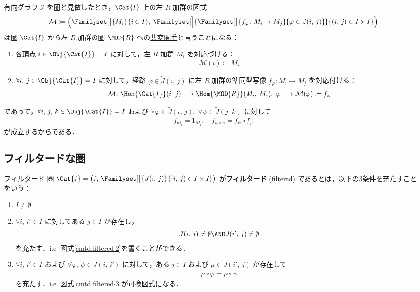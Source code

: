 \documentclass[algtopo_main]{subfiles}
\begin{document}
有向グラフ $\mathcal{I}$ を圏と見做したとき，$\Cat{I}$ 上の左 $R$ 加群の図式
\begin{align}
	\mathcal{M} \coloneqq \Bigl( \Familyset[\big]{M_i}{i \in I},\; \Familyset[\Big]{\Familyset[\big]{f_\varphi \colon M_i \to M_j}{\varphi \in J(i,\, j)}}{(i,\, j) \in I \times I} \Bigr)
\end{align}
は圏 $\Cat{I}$ から左 $R$ 加群の圏 $\MOD{R}$ への\hyperref[def:covariant]{共変関手}と言うことになる：
\begin{enumerate}
	\item 各頂点 $i \in \Obj{\Cat{I}} = I$ に対して，左 $R$ 加群 $M_i$ を対応づける：
	\begin{align}
		\mathcal{M}(i) \coloneqq M_i
	\end{align}
	\item $\forall i,\, j \in \Obj{\Cat{I}} = I$ に対して，経路 $\varphi \in \tilde{J}(i,\, j)$ に左 $R$ 加群の準同型写像 $f_\varphi \colon M_i \to M_j$ を対応付ける：
	\begin{align}
		\mathcal{M} \colon \Hom{\Cat{I}}(i,\, j) \lto \Hom{\MOD{R}}(M_i,\, M_j),\; \varphi \lmto \mathcal{M}(\varphi) \coloneqq f_\varphi
	\end{align}
\end{enumerate}
であって，$\forall i,\, j,\, k \in \Obj{\Cat{I}} = I$ および $\forall \varphi \in \tilde{J}(i,\, j),\; \forall \psi \in \tilde{J}(j,\, k)$ に対して
\begin{align}
	f_{\mathrm{id}_i} = 1_{M_i},\quad f_{\psi \circ \varphi} = f_{\psi} \circ f_{\varphi}
\end{align}
が成立するからである．

\subsection{フィルタードな圏}

\begin{mydef}[label=def:filtered]{フィルタード}
	圏 $\Cat{I} = \bigl( I,\, \Familyset[\big]{J(i,\, j)}{(i,\, j) \in I \times I} \bigr) $ が\textbf{フィルタード} (filtered) であるとは，以下の3条件を充たすことをいう：
	\begin{enumerate}
		\item $I \neq \emptyset$
		\item $\forall i,\, i' \in I$ に対してある $j \in I$ が存在し，
		\begin{align}
			J(i,\, j) \neq \emptyset \AND J(i',\, j) \neq \emptyset
		\end{align}
		を充たす．i.e. 図式\ref{cmtd:filtered-2}を書くことができる．
		\item $\forall i,\, i' \in I$ および $\forall \varphi,\, \psi \in J(i,\, i')$ に対して，ある $j \in I$ および $\mu \in J(i',\, j)$ が存在して
		\begin{align}
			\mu \circ \varphi = \mu \circ \psi
		\end{align}
		を充たす．i.e. 図式\ref{cmtd:filtered-3}が\hyperref[def:commutative]{可換図式}になる．
	\end{enumerate}
\end{mydef}
\end{document}
